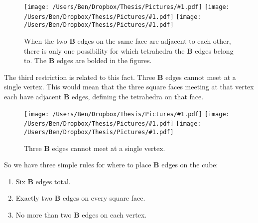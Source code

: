 \documentclass[12pt]{scrippsthesis}
\newcommand{\pic}[2]{\texttt{[image: /Users/Ben/Dropbox/Thesis/Pictures/\#1.pdf]}}
\theoremstyle{definition}
\theoremstyle{remark}
\theoremstyle{plain}
\begin{document}
\begin{figure}[H]
\centerline{\hfill
\pic{Bacross}{width=1.5in}\hfill
\pic{Bacross2}{width=1.5in}\hfill\hfill
\pic{Badjacent}{width=1.5in}\hfill}
\caption{When the two {\bf B} edges on the same face are adjacent to each other, there is only one possibility for which tetrahedra the {\bf B} edges belong to.  The {\bf B} edges are bolded in the figures.}
\end{figure}

The third restriction is related to this fact.  Three {\bf B} edges cannot meet at a single vertex.  This would mean that the three square faces meeting at that vertex each have adjacent {\bf B} edges, defining the tetrahedra on that face.

\begin{figure}[H]
\centerline{\hfill
\pic{3vert1}{width=1.5in}\hfill
\pic{3vert2}{width=1.5in}\hfill
\pic{3vert3}{width=1.5in}\hfill}
\caption{ Three {\bf B} edges cannot meet at a single vertex. }
\end{figure}

So we have three simple rules for where to place {\bf B} edges on the cube:
\begin{enumerate}
\item Six {\bf B} edges total.
\item Exactly two {\bf B} edges on every square face.
\item No more than two {\bf B} edges on each vertex.
\end{enumerate}
\end{document}
